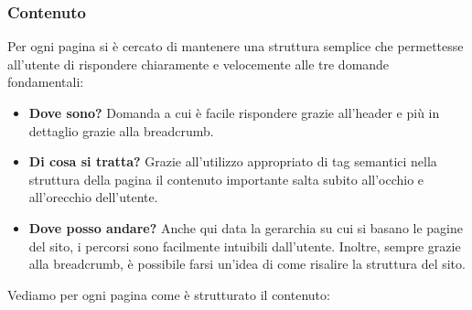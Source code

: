 \subsubsection{Contenuto}
Per ogni pagina si è cercato di mantenere una struttura semplice che permettesse all'utente di rispondere chiaramente e velocemente alle tre domande fondamentali:
    \begin{itemize}
        \item \textbf{Dove sono?} Domanda a cui è facile rispondere grazie all'header e più in dettaglio grazie alla breadcrumb.
        \item \textbf{Di cosa si tratta?} Grazie all'utilizzo appropriato di tag semantici nella struttura della pagina il contenuto importante salta subito all'occhio e all'orecchio dell'utente.
        \item \textbf{Dove posso andare?} Anche qui data la gerarchia su cui si basano le pagine del sito, i percorsi sono facilmente intuibili dall'utente. Inoltre, sempre grazie alla breadcrumb, è possibile farsi un'idea di come risalire la struttura del sito.
    \end{itemize}
Vediamo per ogni pagina come è strutturato il contenuto:
